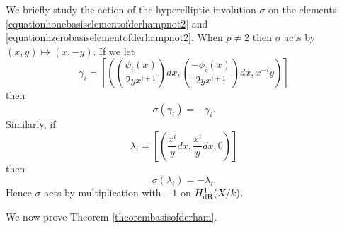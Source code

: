    \begin{rem}
    We briefly study the action of the hyperelliptic involution $\sigma$ on the elements \eqref{equationhonebasiselementofderhampnot2} and \eqref{equationhzerobasiselementofderhampnot2}. 
    When $p \neq 2$ then $\sigma$ acts by $(x,y) \mapsto (x,-y)$.
    If we let
        \[
        \gamma_i = \left[ \left( \left( \frac{\psi_i(x)}{2yx^{i+1}}\right) dx, \left(\frac{-\phi_i(x)}{2yx^{i+1}}\right) dx, x^{-i}y\right) \right]
        \]
    then 
        \begin{equation*}
        \sigma(\gamma_i) = -\gamma_i.
        \end{equation*}
    Similarly, if 
        \[
        \lambda_i = \left[ \left( \frac{x^i}{y}dx, \frac{x^i}{y}dx, 0 \right) \right]
        \]
    then 
        \[
        \sigma(\lambda_i) = - \lambda_i.
        \]
    Hence $\sigma$ acts by multiplication with $-1$ on $H_{\text {dR}}^1(X/k)$.
    \end{rem}


We now prove Theorem \ref{theorembasisofderham}.


